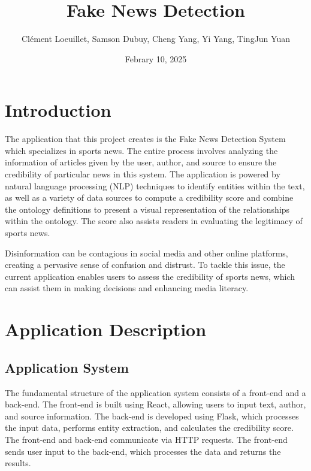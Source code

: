 \documentclass[11pt]{article}
\title{Fake News Detection}
\author{Cl\'ement Loeuillet, Samson Dubuy, Cheng Yang, Yi Yang, TingJun Yuan}
\date{Febrary 10, 2025}
\begin{document}
\maketitle  

\section{Introduction}
The application that this project creates is the Fake News Detection System which specializes in sports news. The entire process involves analyzing the information of articles given by the user, author, and source to ensure the credibility of particular news in this system. The application is powered by natural language processing (NLP) techniques to identify entities within the text, as well as a variety of data sources to compute a credibility score and combine the ontology definitions to present a visual representation of the relationships within the ontology. The score also assists readers in evaluating the legitimacy of sports news.

Disinformation can be contagious in social media and other online platforms, creating a pervasive sense of confusion and distrust. To tackle this issue, the current application enables users to assess the credibility of sports news, which can assist them in making decisions and enhancing media literacy.

\section{Application Description}
\subsection{Application System}
The fundamental structure of the application system consists of a front-end and a back-end. The front-end is built using React, allowing users to input text, author, and source information. The back-end is developed using Flask, which processes the input data, performs entity extraction, and calculates the credibility score. The front-end and back-end communicate via HTTP requests. The front-end sends user input to the back-end, which processes the data and returns the results.
\end{document}

